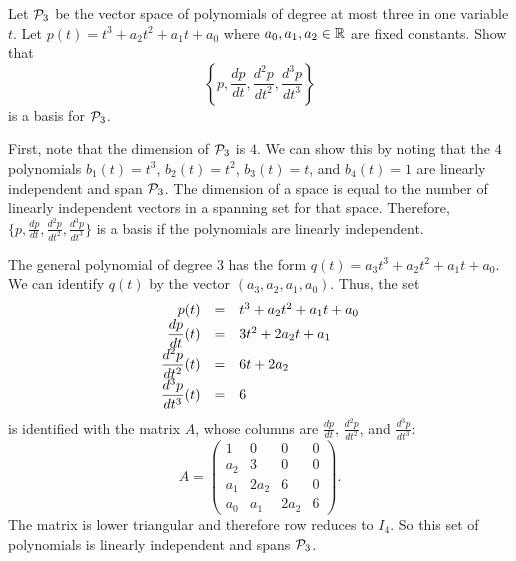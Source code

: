 \documentclass{ximera}
\begin{document}
\begin{exercise} \label{c5.5.6}
Let ${\cal P}_3$ be the vector space of polynomials of degree at
most three in one variable $t$.  Let $p(t)=t^3+a_2t^2+a_1t+a_0$ where
$a_0,a_1,a_2\in\mbox{$\mathbb{R}$}$ are fixed constants.  Show that
\[
\left\{ p, \frac{dp}{dt}, \frac{d^2p}{dt^2}, \frac{d^3p}{dt^3}\right\}
\]
is a basis for ${\cal P}_3$.

\begin{solution}

\soln
First, note that the dimension of ${\cal P}_3$ is $4$.  We can show
this by noting that the $4$ polynomials $b_1(t) = t^3$, $b_2(t) =
t^2$, $b_3(t) = t$, and $b_4(t) = 1$ are linearly independent and
span ${\cal P}_3$.  The dimension of a space is equal to the number of
linearly independent vectors in a spanning set for that space.
Therefore, $\{p, \frac{dp}{dt}, \frac{d^2p}{dt^2}, \frac{d^3p}{dt^3}\}$
is a basis if the polynomials are linearly independent.

\para The general polynomial of degree $3$ has the form $q(t) =
a_3t^3 + a_2t^2 + a_1t + a_0$.  We can identify $q(t)$ by the vector 
$(a_3,a_2,a_1,a_0)$.  Thus, the set
\[
\begin{array}{rcl}
\displaystyle p(t) & = & t^3 + a_2t^2 + a_1t + a_0 \\
\displaystyle \frac{dp}{dt}(t) & = & 3t^2 + 2a_2t + a_1 \\
\displaystyle \frac{d^2p}{dt^2}(t) & = & 6t + 2a_2 \\
\displaystyle \frac{d^3p}{dt^3}(t) & = & 6 \end{array}
\]
is identified with the matrix $A$, whose columns are 
$\frac{dp}{dt}$, $\frac{d^2p}{dt^2}$, and $\frac{d^3p}{dt^3}$:
\[ A = \left(\begin{array}{cccc} 1 & 0 & 0 & 0 \\
a_2 & 3 & 0 & 0 \\ a_1 & 2a_2 & 6 & 0 \\ a_0 & a_1 & 2a_2 & 6
\end{array}\right). \]
The matrix is lower triangular and therefore row reduces to $I_4$.  So
this set of polynomials is linearly independent and spans ${\cal P}_3$.

\end{solution}
\end{exercise}
\end{document}
